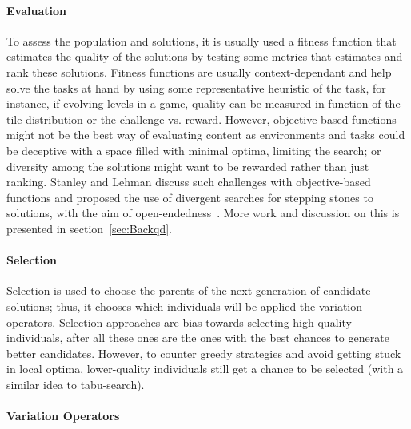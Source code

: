 \paragraph{Evaluation}

To assess the population and solutions, it is usually used a fitness function that estimates the quality of the solutions by testing some metrics that estimates and rank these solutions. Fitness functions are usually context-dependant and help solve the tasks at hand by using some representative heuristic of the task, for instance, if evolving levels in a game, quality can be measured in function of the tile distribution or the challenge vs. reward. However, objective-based functions might not be the best way of evaluating content as environments and tasks could be deceptive with a space filled with minimal optima, limiting the search; or diversity among the solutions might want to be rewarded rather than just ranking. Stanley and Lehman discuss such challenges with objective-based functions and proposed the use of divergent searches for stepping stones to solutions, with the aim of open-endedness~\cite{stanley2015-mythObjective}. More work and discussion on this is presented in section~\ref{sec:Backqd}.

\paragraph{Selection}

Selection is used to choose the parents of the next generation of candidate solutions; thus, it chooses which individuals will be applied the variation operators. Selection approaches are bias towards selecting high quality individuals, after all these ones are the ones with the best chances to generate better candidates. However, to counter greedy strategies and avoid getting stuck in local optima, lower-quality individuals still get a chance to be selected (with a similar idea to tabu-search). 

\paragraph{Variation Operators}

